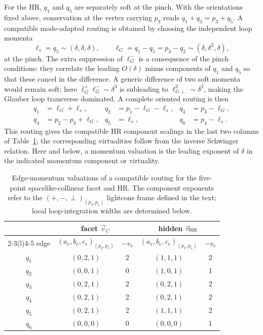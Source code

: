 \documentclass[a4paper,11pt]{article}
\newcommand{\vHR}{\vec v_{\rm HR}}
\begin{document}
For the HR, \(q_1\) and \(q_5\) are separately soft at the pinch.  With the orientations
fixed above, conservation at the vertex carrying \(p_3\) reads
\(q_1+q_3=p_3+q_5\).  A compatible mode-adapted routing is obtained by
choosing the independent loop momenta
\begin{equation}
 \ell_s=q_5\sim(\delta,\delta,\delta),
 \qquad
 \ell_G=q_1-q_5
 =p_3-q_3\sim(\delta,\delta^2,\delta),
 \label{eq:five-sc-glauber-rerouting}
\end{equation}
at the pinch.  The extra suppression of \(\ell_G^-\) is a consequence of the pinch
conditions: they correlate the leading \(O(\delta)\) minus components of
\(q_1\) and \(q_5\) so that these cancel in the difference.  A generic
difference of two soft momenta would remain soft; here
\(\ell_G^+\ell_G^-\sim\delta^3\) is subleading to
\(\ell_{G\perp}^2\sim\delta^2\), making the Glauber loop transverse dominated.
A complete oriented routing is then
\[
 \begin{aligned}
 q_1&=\ell_G+\ell_s, &
 q_2&=p_1-\ell_G-\ell_s, &
 q_3&=p_3-\ell_G,\\
 q_4&=p_2-p_3+\ell_G, &
 q_5&=\ell_s, &
 q_6&=p_4-\ell_s.
 \end{aligned}
\]
This routing gives the compatible HR component scalings in the last two columns
of Table~\ref{tab:five-sc-edge-flow}; the corresponding virtualities follow
from the inverse Schwinger relation.
Here and below, a momentum valuation is the leading exponent of \(\delta\) in
the indicated momentum component or virtuality.

\begin{table}[H]
\centering
\small
\begin{tabular}{@{}c cc cc@{}}
\toprule
& \multicolumn{2}{c}{facet \(\vec v_C\)}
& \multicolumn{2}{c}{hidden \(\vHR\)}\\
\cmidrule(lr){2-3}\cmidrule(l){4-5}
edge & \((a_e,b_e,c_e)_{(p_2,p_1)}\) & \(-v_e\)
     & \((a_e,b_e,c_e)_{(p_2,p_1)}\) & \(-v_e\)\\
\midrule
\(q_1\) & \((0,2,1)\) & 2 & \((1,1,1)\) & 2\\
\(q_2\) & \((0,0,1)\) & 0 & \((1,0,1)\) & 1\\
\(q_3\) & \((0,2,1)\) & 2 & \((0,2,1)\) & 2\\
\(q_4\) & \((0,2,1)\) & 2 & \((0,2,1)\) & 2\\
\(q_5\) & \((0,2,1)\) & 2 & \((1,1,1)\) & 2\\
\(q_6\) & \((0,0,0)\) & 0 & \((0,0,0)\) & 1\\
\bottomrule
\end{tabular}
\caption{Edge-momentum valuations of a compatible routing for the five-point
spacelike-collinear facet and HR.  The component exponents refer to the
\((+,-,\perp)_{(p_2,p_1)}\) lightcone frame defined in the text; local loop-integration
widths are determined below.}
\label{tab:five-sc-edge-flow}
\end{table}
\end{document}
